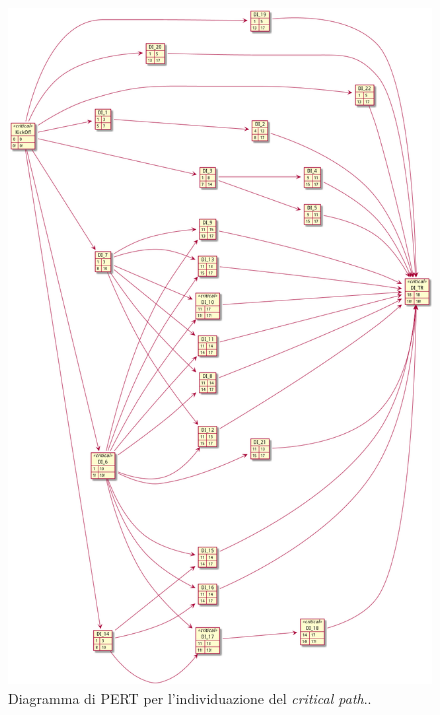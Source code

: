 \begin{figure}[H]
    \centering
    \includegraphics[width=\textwidth]{../img/pert-diagram.pm}
    \caption{Diagramma di PERT per l'individuazione del \textit{critical path}..}
    \label{fig:pert-diagram}
\end{figure}

